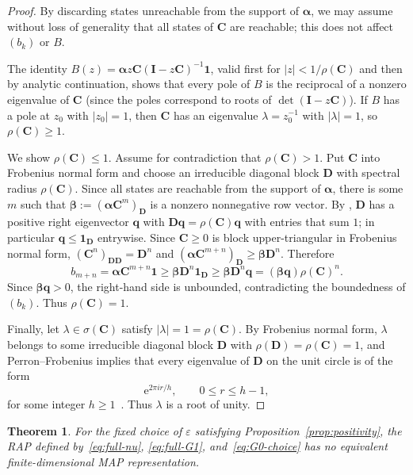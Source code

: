 \documentclass[11pt]{article}
\newtheorem{theorem}{Theorem}
\theoremstyle{definition}
\theoremstyle{remark}
\newcommand{\e}{\mathrm{e}}
\begin{document}
\begin{proof}
By discarding states unreachable from the support of $\bm{\alpha}$, we may assume without loss of generality that all states of $\bm{C}$ are reachable; this does not affect $(b_k)$ or $B$.

The identity $B(z)=\bm{\alpha}z\bm{C}(\bm{I}-z\bm{C})^{-1}\bm{1}$, valid first for $|z|<1/\rho(\bm{C})$ and then by analytic continuation, shows that every pole of $B$ is the reciprocal of a nonzero eigenvalue of $\bm{C}$ (since the poles correspond to roots of $\det(\bm{I}-z\bm{C})$). If $B$ has a pole at $z_0$ with $|z_0|=1$, then $\bm{C}$ has an eigenvalue $\lambda=z_0^{-1}$ with $|\lambda|=1$, so $\rho(\bm{C})\ge 1$.

We show $\rho(\bm{C})\le 1$. Assume for contradiction that $\rho(\bm{C})>1$. Put $\bm{C}$ into Frobenius normal form and choose an irreducible diagonal block $\bm{D}$ with spectral radius $\rho(\bm{C})$. Since all states are reachable from the support of $\bm{\alpha}$, there is some $m$ such that $\bm{\beta}:=(\bm{\alpha}\bm{C}^m)_{\bm{D}}$ is a nonzero nonnegative row vector. By  \cite[Theorem~8.4.4(c)]{HornJohnson2013}, $\bm{D}$ has a positive right eigenvector $\bm{q}$ with $\bm{D}\bm{q}=\rho(\bm{C})\bm{q}$ with entries that sum $1$; in particular $\bm{q}\le\bm{1}_{\bm{D}}$ entrywise. Since $\bm{C}\ge 0$ is block upper-triangular in Frobenius normal form, $(\bm{C}^n)_{\bm{D}\bm{D}}=\bm{D}^n$ and $(\bm{\alpha}\bm{C}^{m+n})_{\bm{D}}\ge\bm{\beta}\bm{D}^n$. Therefore
\[
b_{m+n} = \bm{\alpha}\bm{C}^{m+n}\bm{1} \ge \bm{\beta}\bm{D}^n\bm{1}_{\bm{D}} \ge \bm{\beta}\bm{D}^n\bm{q} = (\bm{\beta}\bm{q})\rho(\bm{C})^n.
\]
Since $\bm{\beta}\bm{q}>0$, the right-hand side is unbounded, contradicting the boundedness of $(b_k)$. Thus $\rho(\bm{C})=1$.

Finally, let $\lambda\in\sigma(\bm{C})$ satisfy $|\lambda|=1=\rho(\bm{C})$. By Frobenius normal form, $\lambda$ belongs to some irreducible diagonal block $\bm{D}$ with $\rho(\bm{D})=\rho(\bm{C})=1$, and Perron--Frobenius implies that every eigenvalue of $\bm{D}$ on the unit circle is of the form
\[
\e^{2\pi ir/h}, \qquad 0\le r\le h-1,
\]
for some integer $h\ge 1$~\cite[Corollary~8.4.6(c)]{HornJohnson2013}. Thus $\lambda$ is a root of unity.
\end{proof}

\begin{theorem}\label{thm:no-MAP}
For the fixed choice of $\varepsilon$ satisfying Proposition~\ref{prop:positivity}, the RAP defined by~\eqref{eq:full-nu}, \eqref{eq:full-G1}, and~\eqref{eq:G0-choice} has no equivalent finite-dimensional MAP representation.
\end{theorem}
\end{document}
